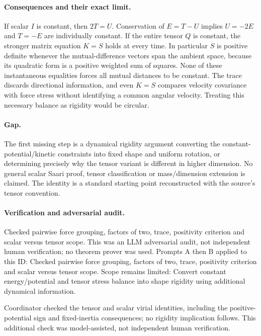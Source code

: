 \documentclass[11pt]{article}
\begin{document}
\paragraph{Consequences and their exact limit.}If scalar \(I\) is constant, then \(2T=U\). Conservation of \(E=T-U\) implies \(U=-2E\) and \(T=-E\) are individually constant. If the entire tensor \(Q\) is constant, the stronger matrix equation \(K=S\) holds at every time. In particular \(S\) is positive definite whenever the mutual-difference vectors span the ambient space, because its quadratic form is a positive weighted sum of squares.
None of these instantaneous equalities forces all mutual distances to be constant. The trace discards directional information, and even \(K=S\) compares velocity covariance with force stress without identifying a common angular velocity. Treating this necessary balance as rigidity would be circular.
\paragraph{Gap.}The first missing step is a dynamical rigidity argument converting the constant-potential/kinetic constraints into fixed shape and uniform rotation, or determining precisely why the tensor variant is different in higher dimension. No general scalar Saari proof, tensor classification or mass/dimension extension is claimed. The identity is a standard starting point reconstructed with the source's tensor convention.

\paragraph{Verification and adversarial audit.}
Checked pairwise force grouping, factors of two, trace, positivity criterion and scalar versus tensor scope. This was an LLM adversarial audit, not independent human verification; no theorem prover was used. Prompts A then B applied to this ID: Checked pairwise force grouping, factors of two, trace, positivity criterion and scalar versus tensor scope. Scope remains limited: Convert constant energy/potential and tensor stress balance into shape rigidity using additional dynamical information.

Coordinator checked the tensor and scalar virial identities, including the positive-potential sign and fixed-inertia consequences; no rigidity implication follows. This additional check was model-assisted, not independent human verification.
\end{document}
